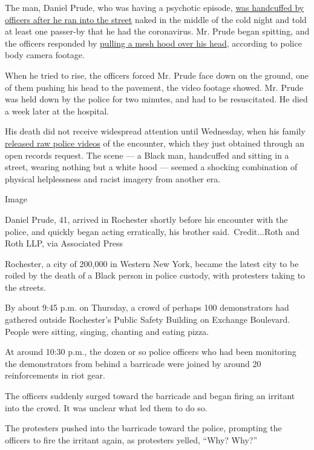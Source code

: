 The man, Daniel Prude, who was having a psychotic episode,
\href{https://www.nytimes3xbfgragh.onion/2020/09/02/nyregion/daniel-prude-rochester-police.html}{was
handcuffed by officers after he ran into the street} naked in the middle
of the cold night and told at least one passer-by that he had the
coronavirus. Mr. Prude began spitting, and the officers responded by
\href{https://www.nytimes3xbfgragh.onion/2020/09/03/nyregion/spit-hoods-police.html}{pulling
a mesh hood over his head}, according to police body camera footage.

When he tried to rise, the officers forced Mr. Prude face down on the
ground, one of them pushing his head to the pavement, the video footage
showed. Mr. Prude was held down by the police for two minutes, and had
to be resuscitated. He died a week later at the hospital.

His death did not receive widespread attention until Wednesday, when his
family
\href{https://www.democratandchronicle.com/story/news/2020/09/02/daniel-prude-rochester-ny-police-died-march-2020-after-officers-restrained-him/5682948002/}{released
raw police videos} of the encounter, which they just obtained through an
open records request. The scene --- a Black man, handcuffed and sitting
in a street, wearing nothing but a white hood --- seemed a shocking
combination of physical helplessness and racist imagery from another
era.

Image

Daniel Prude, 41, arrived in Rochester shortly before his encounter with
the police, and quickly began acting erratically, his brother
said.~Credit...Roth and Roth LLP, via Associated Press

Rochester, a city of 200,000 in Western New York, became the latest city
to be roiled by the death of a Black person in police custody, with
protesters taking to the streets.

By about 9:45 p.m. on Thursday, a crowd of perhaps 100 demonstrators had
gathered outside Rochester's Public Safety Building on Exchange
Boulevard. People were sitting, singing, chanting and eating pizza.

At around 10:30 p.m., the dozen or so police officers who had been
monitoring the demonstrators from behind a barricade were joined by
around 20 reinforcements in riot gear.

The officers suddenly surged toward the barricade and began firing an
irritant into the crowd. It was unclear what led them to do so.

The protesters pushed into the barricade toward the police, prompting
the officers to fire the irritant again, as protesters yelled, ``Why?
Why?''

